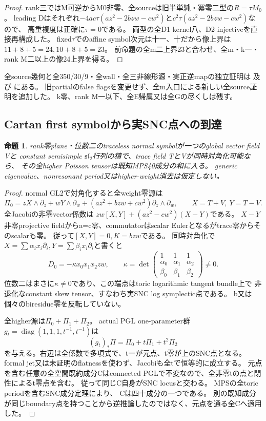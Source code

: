 \documentclass[a4paper,11pt]{ltjsarticle}
\newtheorem{proposition}{命題}[section]
\theoremstyle{definition}
\begin{document}
\begin{proof}
rank三ではM可逆からM0非零、全sourceは旧半単純・冪零二型の$R=\tau M_0$。
leading Dはそれぞれ$-4ac\tau(az^2-2bzw-cw^2)$と$c^2\tau(az^2-2bzw-cw^2)$なので、
高重複度は正確に$\tau=0$である。
両型の全D1 kernel八、D2 injectiveを直接再構成した。
fixed$\tau$でのaffine symbol次元は十一、十だから像上界は$11+8+5=24,10+8+5=23$。
前命題の全m二上界23と合わせ、全m・k一・rank M二以上の像24上界を得る。
\end{proof}
全source幾何と全350/30/9・全wall・全三非線形源・実正逆mapの独立証明は
及び
にある。
旧partialのfalse flagsを変更せず、全m入口による新しい全source証明を追加した。
k零、rank M一以下、全E帰属又は全Gの尽くしは残す。

\subsection{Cartan first symbolから実SNC点への到達}
\begin{proposition}\label{prop:plane-zero-cartan-MPS}
rank零plane・位数二のtraceless normal symbolが一つのglobal vector field Vと
constant semisimple $\mathfrak{sl}_2$行列の積で、trace field TとVが同時対角化可能なら、
その全higher Poisson tensorは既知MPS40成分の和に入る。
generic eigenvalue、nonresonant period又はhigher-weight消去は仮定しない。
\end{proposition}
\begin{proof}
normal GL2で対角化すると全weight零源は
\[
 \Pi_0=zX\wedge\partial_z+wY\wedge\partial_w+
 (az^2+bzw+cw^2)\partial_z\wedge\partial_w,
 \qquad X=T+V,\ Y=T-V.
\]
全Jacobiの非零vector係数は
$zw[X,Y]+(az^2-cw^2)(X-Y)$である。
$X-Y$非零projective fieldからa=c零、commutatorはscalar Eulerとなるがtrace零からそのscalarも零。
従って$[X,Y]=0,K=bzw$である。
同時対角化で$X=\sum\alpha_ix_i\partial_i,Y=\sum\beta_ix_i\partial_i$と書くと
\[
 D_0=-\kappa x_0x_1x_2zw,\qquad
 \kappa=\det\begin{pmatrix}1&1&1\\\alpha_0&\alpha_1&\alpha_2\\\beta_0&\beta_1&\beta_2\end{pmatrix}\ne0.
\]
位数二はまさに$\kappa\ne0$であり、この端点はtoric logarithmic tangent bundle上で
非退化なconstant skew tensor、すなわち実SNC log symplectic点である。
b又は個々のbiresidue零を反転していない。

全higher源は$\Pi_0+\Pi_1+\Pi_2$。
actual PGL one-parameter群$g_t=\operatorname{diag}(1,1,1,t^{-1},t^{-1})$は
\[
 (g_t)_*\Pi=\Pi_0+t\Pi_1+t^2\Pi_2
\]
を与える。右辺は全係数で多項式で、t一が元点、t零が上のSNC点となる。
formal jet又は未証明のflatnessを使わず、Jacobiも全tで恒等的に成立する。
元点を含む任意の全空間既約成分Cはconnected PGLで不変なので、全非零tの点と閉性によるt零点を含む。
従って同じC自身がSNC locusと交わる。
MPS\cite[Theorem 1.4; \S5.3; Example 6.24]{mps}の全toric periodを含むSNC成分定理により、
Cは四十成分の一つである。
別の既知成分が同じboundary点を持つことから逆推論したのではなく、元点を通る全Cへ適用した。
\end{proof}
\end{document}
